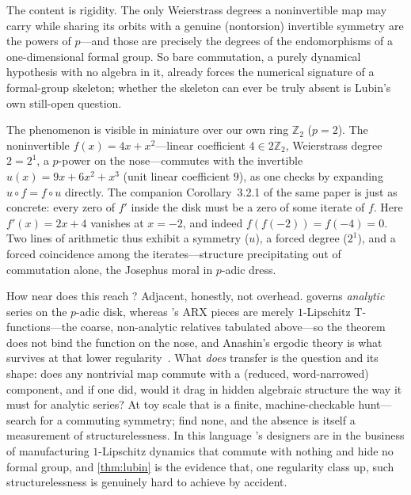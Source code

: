 The content is rigidity. The only Weierstrass degrees a noninvertible
map may carry while sharing its orbits with a genuine (nontorsion)
invertible symmetry are the powers of $p$---and those are precisely the
degrees of the endomorphisms of a one-dimensional formal group. So bare
commutation, a purely dynamical hypothesis with no algebra in it, already
forces the numerical signature of a formal-group skeleton; whether the
skeleton can ever be truly absent is Lubin's own still-open question.

The phenomenon is visible in miniature over our own ring $\mathbb{Z}_2$
($p=2$). The noninvertible $f(x) = 4x + x^{2}$---linear coefficient
$4\in 2\mathbb{Z}_2$, Weierstrass degree $2 = 2^{1}$, a $p$-power on the
nose---commutes with the invertible $u(x) = 9x + 6x^{2} + x^{3}$ (unit
linear coefficient $9$), as one checks by expanding
$u\circ f = f\circ u$ directly. The companion Corollary~3.2.1 of the same
paper is just as concrete: every zero of $f'$ inside the disk must be a
zero of some iterate of $f$. Here $f'(x) = 2x + 4$ vanishes at $x=-2$,
and indeed $f(f(-2)) = f(-4) = 0$. Two lines of arithmetic thus exhibit a
symmetry ($u$), a forced degree ($2^{1}$), and a forced coincidence among
the iterates---structure precipitating out of commutation alone, the
Josephus moral in $p$-adic dress.

How near does this reach \SHA{}? Adjacent, honestly, not overhead.
 governs \emph{analytic} series on the $p$-adic disk,
whereas \SHA{}'s ARX pieces are merely $1$-Lipschitz T-functions---the
coarse, non-analytic relatives tabulated above---so the theorem does not
bind the function on the nose, and Anashin's ergodic theory is what
survives at that lower regularity~\citep{Anashin2006, KlimovShamir2003}.
What \emph{does} transfer is the question and its shape: does any
nontrivial map commute with a (reduced, word-narrowed) \SHA{} component,
and if one did, would it drag in hidden algebraic structure the way it
must for analytic series? At toy scale that is a finite, machine-checkable
hunt---search for a commuting symmetry; find none, and the absence is
itself a measurement of structurelessness. In this language \SHA{}'s
designers are in the business of manufacturing $1$-Lipschitz dynamics
that commute with nothing and hide no formal group, and \cref{thm:lubin}
is the evidence that, one regularity class up, such structurelessness is
genuinely hard to achieve by accident.

